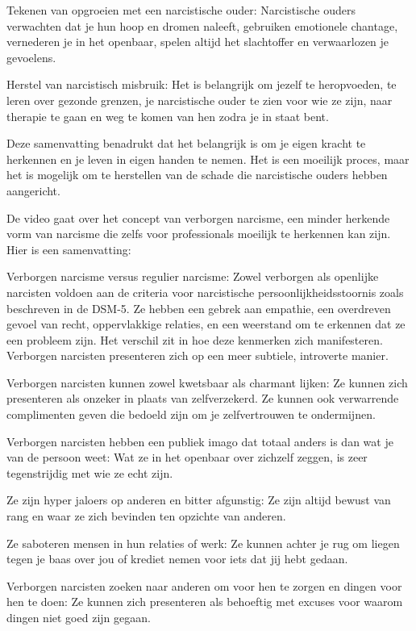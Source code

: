 Tekenen van opgroeien met een narcistische ouder: Narcistische ouders verwachten dat je hun hoop en dromen naleeft, gebruiken emotionele chantage, vernederen je in het openbaar, spelen altijd het slachtoffer en verwaarlozen je gevoelens.

Herstel van narcistisch misbruik: Het is belangrijk om jezelf te heropvoeden, te leren over gezonde grenzen, je narcistische ouder te zien voor wie ze zijn, naar therapie te gaan en weg te komen van hen zodra je in staat bent.

Deze samenvatting benadrukt dat het belangrijk is om je eigen kracht te herkennen en je leven in eigen handen te nemen. Het is een moeilijk proces, maar het is mogelijk om te herstellen van de schade die narcistische ouders hebben aangericht.

De video gaat over het concept van verborgen narcisme, een minder herkende vorm van narcisme die zelfs voor professionals moeilijk te herkennen kan zijn. Hier is een samenvatting:

Verborgen narcisme versus regulier narcisme: Zowel verborgen als openlijke narcisten voldoen aan de criteria voor narcistische persoonlijkheidsstoornis zoals beschreven in de DSM-5. Ze hebben een gebrek aan empathie, een overdreven gevoel van recht, oppervlakkige relaties, en een weerstand om te erkennen dat ze een probleem zijn. Het verschil zit in hoe deze kenmerken zich manifesteren. Verborgen narcisten presenteren zich op een meer subtiele, introverte manier.

Verborgen narcisten kunnen zowel kwetsbaar als charmant lijken: Ze kunnen zich presenteren als onzeker in plaats van zelfverzekerd. Ze kunnen ook verwarrende complimenten geven die bedoeld zijn om je zelfvertrouwen te ondermijnen.

Verborgen narcisten hebben een publiek imago dat totaal anders is dan wat je van de persoon weet: Wat ze in het openbaar over zichzelf zeggen, is zeer tegenstrijdig met wie ze echt zijn.

Ze zijn hyper jaloers op anderen en bitter afgunstig: Ze zijn altijd bewust van rang en waar ze zich bevinden ten opzichte van anderen.

Ze saboteren mensen in hun relaties of werk: Ze kunnen achter je rug om liegen tegen je baas over jou of krediet nemen voor iets dat jij hebt gedaan.

Verborgen narcisten zoeken naar anderen om voor hen te zorgen en dingen voor hen te doen: Ze kunnen zich presenteren als behoeftig met excuses voor waarom dingen niet goed zijn gegaan.

